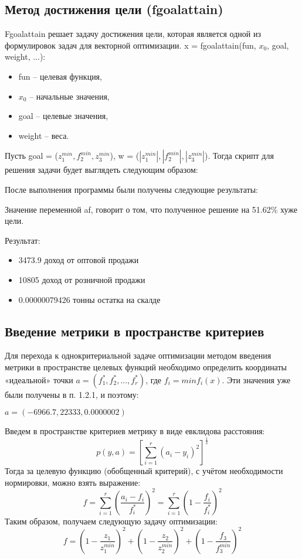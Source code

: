 \documentclass[14pt,a4paper,report]{report}
\begin{document}
\subsection{Метод достижения цели (fgoalattain)}
Fgoalattain решает задачу достижения цели, которая является одной из формулировок задач для векторной оптимизации.
x = fgoalattain(fun, $x_0$, goal, weight, ...):
\begin{itemize}
\item fun – целевая функция,
\item $x_0$ – начальные значения,
\item goal – целевые значения,
\item weight – веса.
\end{itemize}
Пусть goal = ($z_1^{min}, f_2^{min}, z_3^{min}$), w = ($|z_1^{min}|, |f_2^{min}|, |z_3^{min}|$). Тогда скрипт для решения задачи будет выглядеть следующим образом:



После выполнения программы были получены следующие результаты:


Значение переменной af, говорит о том, что полученное решение на 51.62\% хуже цели. 


Результат:
\begin{itemize}
\item 3473.9 доход от оптовой продажи
\item 10805 доход от розничной продажи
\item 0.00000079426 тонны остатка на скалде
\end{itemize}






\subsection{Введение метрики в пространстве критериев}

Для перехода к однокритериальной задаче оптимизации методом введения метрики в пространстве целевых функций необходимо определить координаты «идеальной» точки $a=(f_1^*, f_2^*, ..., f_r^*)$,  где $f_i = min f_i(x)$. Эти значения
уже были получены в п. 1.2.1, и поэтому:



\begin{center}
$a = (-6966.7, 22333, 0.0000002)$
\end{center}

Введем в пространстве критериев метрику в виде евклидова расстояния:
\begin{equation}
p(y, a) = [\sum_{i=1}^r(a_i-y_i)^2]^{\frac{1}{2}} 
\end{equation}
Тогда за целевую функцию (обобщенный критерий), с учётом необходимости нормировки, можно взять выражение:
\begin{equation}
f=\sum_{i=1}^r(\frac{a_i-f_i}{f_i^*})^2=\sum_{i=1}^r(1-\frac{f_i}{f_i^*})^2
\end{equation}
Таким образом, получаем следующую задачу оптимизации:
\begin{equation}
f=(1-\frac{z_1}{z_1^{min}})^2+(1-\frac{z_2}{z_2^{min}})^2+(1-\frac{f_3}{f_3^{min}})^2
\end{equation}
\end{document}

